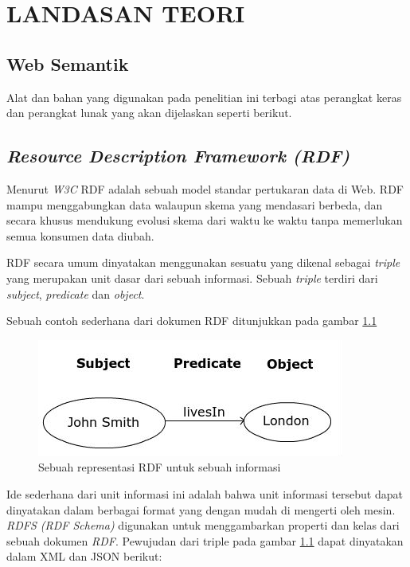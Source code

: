 
\chapter{LANDASAN TEORI}

\section{Web Semantik}
	Alat dan bahan yang digunakan pada penelitian ini terbagi atas perangkat keras dan perangkat lunak yang akan dijelaskan seperti berikut.

\section{\emph{Resource Description Framework (RDF)}}
	Menurut \emph{W3C} RDF adalah sebuah model standar pertukaran data di Web. RDF mampu menggabungkan data walaupun skema  yang mendasari berbeda, dan secara khusus mendukung evolusi skema dari waktu ke waktu tanpa memerlukan semua konsumen data diubah.

	RDF secara umum dinyatakan menggunakan sesuatu yang dikenal sebagai \emph{triple} yang merupakan unit dasar dari sebuah informasi. Sebuah \emph{triple} terdiri dari \emph{subject}, \emph{predicate} dan \emph{object}.

	Sebuah contoh sederhana dari dokumen RDF ditunjukkan pada gambar \ref{fig:rdfinstance}

	\begin{figure}[H]
		\centering
			\includegraphics[scale=0.65]{gambar/rdfinstance.jpg}
			\caption{Sebuah representasi RDF untuk sebuah informasi}
			\label{fig:rdfinstance}
	\end{figure}

	Ide sederhana dari unit informasi ini adalah bahwa unit informasi tersebut dapat dinyatakan dalam berbagai format yang dengan mudah di mengerti oleh mesin. \emph{RDFS (RDF Schema)} digunakan untuk menggambarkan properti dan kelas dari sebuah dokumen \emph{RDF}. Pewujudan dari triple pada gambar \ref{fig:rdfinstance} dapat dinyatakan dalam XML dan JSON berikut:

